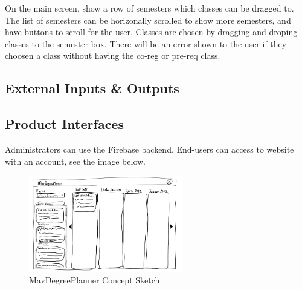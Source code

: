 On the main screen, show a row of semesters which classes can be dragged to.
The list of semesters can be horizonally scrolled to show more semesters, and
have buttons to scroll for the user.
Classes are chosen by dragging and droping classes to the semester box.
There will be an error shown to the user if they choosen a class
without having the co-reg or pre-req class.

\subsection{External Inputs \& Outputs}

\begin{table}[h]
    \caption{Overview of external inputs and outputs}
\end{table}

\subsection{Product Interfaces}

Administrators can use the Firebase backend. End-users can access to website
with an account, see the image below.

\begin{figure}[h!]
	\centering
   	\includegraphics[width=0.60\textwidth]{images/MavDegreePlannerDiagram-Small}
    \caption{MavDegreePlanner Concept Sketch}
\end{figure}
